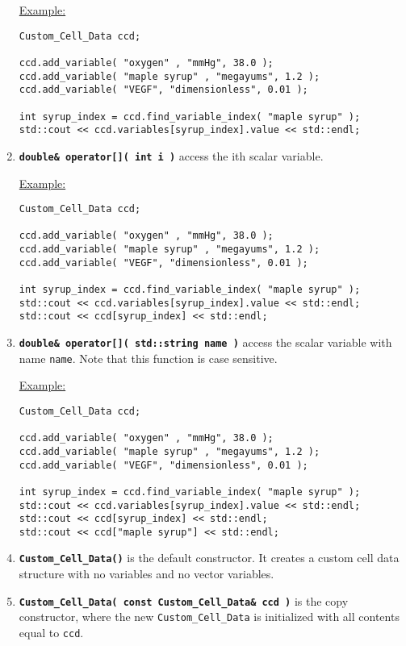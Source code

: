 \documentclass[12pt]{article}
\renewcommand{\v}{\verb}
\newcommand{\smallcode}[1]{\textbf{\texttt{#1}}}
\begin{document}
\begin{enumerate}
\underline{Example:} 
\begin{verbatim}
Custom_Cell_Data ccd; 

ccd.add_variable( "oxygen" , "mmHg", 38.0 ); 
ccd.add_variable( "maple syrup" , "megayums", 1.2 ); 
ccd.add_variable( "VEGF", "dimensionless", 0.01 ); 

int syrup_index = ccd.find_variable_index( "maple syrup" ); 
std::cout << ccd.variables[syrup_index].value << std::endl; 
\end{verbatim}
 	
\item 
\smallcode{double\& operator[]( int i )} access the ith scalar variable. 

\underline{Example:} 
\begin{verbatim}
Custom_Cell_Data ccd; 

ccd.add_variable( "oxygen" , "mmHg", 38.0 ); 
ccd.add_variable( "maple syrup" , "megayums", 1.2 ); 
ccd.add_variable( "VEGF", "dimensionless", 0.01 ); 

int syrup_index = ccd.find_variable_index( "maple syrup" ); 
std::cout << ccd.variables[syrup_index].value << std::endl; 
std::cout << ccd[syrup_index] << std::endl; 
\end{verbatim}

\item 
\smallcode{double\& operator[]( std::string name )}  access the scalar 
variable with name \v|name|. Note that this function is case sensitive. 

\underline{Example:} 
\begin{verbatim}
Custom_Cell_Data ccd; 

ccd.add_variable( "oxygen" , "mmHg", 38.0 ); 
ccd.add_variable( "maple syrup" , "megayums", 1.2 ); 
ccd.add_variable( "VEGF", "dimensionless", 0.01 ); 

int syrup_index = ccd.find_variable_index( "maple syrup" ); 
std::cout << ccd.variables[syrup_index].value << std::endl; 
std::cout << ccd[syrup_index] << std::endl; 
std::cout << ccd["maple syrup"] << std::endl; 
\end{verbatim}

\item 
\smallcode{Custom\_Cell\_Data()} is the default constructor. It creates 
a custom cell data structure with no variables and no vector variables. 
 
\item 
\smallcode{Custom\_Cell\_Data( const Custom\_Cell\_Data\& ccd )} is the 
copy constructor, where the new \v|Custom_Cell_Data| is initialized 
with all contents equal to \v|ccd|. 
 

\end{enumerate}
\end{document}
